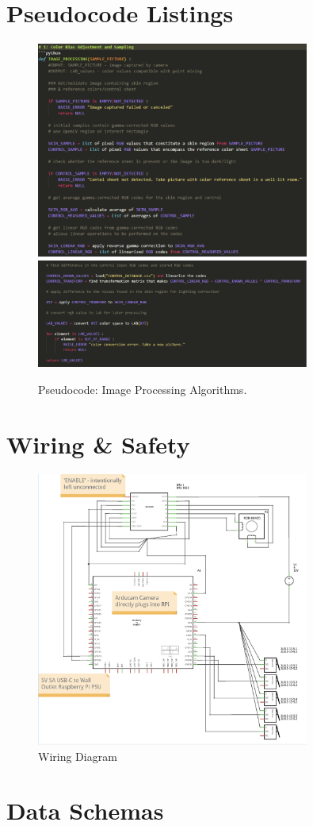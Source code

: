 \documentclass[12pt, letterpaper]{report}
\begin{document}
    \chapter{Pseudocode Listings}
    \begin{figure}[H]
        \centering
        \includegraphics[width=0.8\textwidth]{assets/pseudocode1.png}
        \includegraphics[width=0.8\textwidth]{assets/pseudocode2.png}
        \caption{Pseudocode: Image Processing Algorithms.}
    \end{figure}

    \chapter{Wiring \& Safety}
    \begin{figure}[H]
        \centering
        \includegraphics[width=0.8\textwidth]{assets/wiring.png}
        \caption{Wiring Diagram}
    \end{figure}

    \chapter{Data Schemas}
\end{document}
